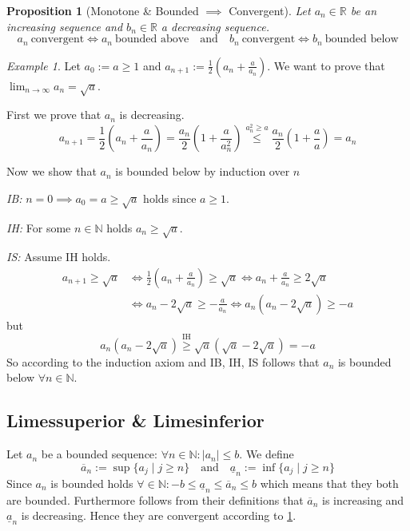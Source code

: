 \documentclass[english,titlepage]{uzhpub}
\theoremstyle{definition}
\theoremstyle{plain}
\newtheorem{proposition}[definition]{Proposition}
\theoremstyle{remark}
\theoremstyle{example}
\newtheorem*{example}{Example}
\begin{document}
   \begin{proposition}[Monotone \& Bounded \(\implies\) Convergent]\label{pro:convergent_monotone_sequence_bounded}
      Let \(a_n \in \mathbb{R}\) be an increasing sequence and \(b_n \in \mathbb{R}\) a decreasing sequence.
      \[a_n~\text{convergent} \iff a_n~\text{bounded above} \quad\text{and}\quad b_n~\text{convergent} \iff b_n~\text{bounded below}\]
   \end{proposition}
   \begin{example}
      Let \(a_0 := a \geq 1\) and \(a_{n+1} := \frac{1}{2} \left(a_n + \frac{a}{a_n}\right)\).
      We want to prove that \(\lim_{n \to \infty} a_n = \sqrt{a}\).

      First we prove that \(a_n\) is decreasing.
      \[a_{n+1} = \frac{1}{2} \left(a_n + \frac{a}{a_n}\right) = \frac{a_n}{2} \left(1 + \frac{a}{a_n^2}\right) \overset{a_n^2 \geq a}{\leq} \frac{a_n}{2} \left(1 + \frac{a}{a}\right) = a_n\]

      Now we show that \(a_n\) is bounded below by induction over \(n\)

      \textit{IB:} \(n = 0 \implies a_0 = a \geq \sqrt{a}\) holds since \(a \geq 1\).

      \textit{IH:} For some \(n \in \mathbb{N}\) holds \(a_n \geq \sqrt{a}\).

      \textit{IS:} Assume IH holds.
      \begin{equation*}
         \begin{split}
            a_{n+1} \geq \sqrt{a} & \iff \frac{1}{2} \left(a_n + \frac{a}{a_n}\right) \geq \sqrt{a} \iff a_n + \frac{a}{a_n} \geq 2 \sqrt{a}\\
                                  & \iff a_n - 2\sqrt{a} \geq - \frac{a}{a_n} \iff a_n(a_n - 2\sqrt{a}) \geq -a
         \end{split}
      \end{equation*}
      but
      \[a_n(a_n - 2 \sqrt{a}) \overset{\text{IH}}{\geq} \sqrt{a}(\sqrt{a} - 2 \sqrt{a}) = -a\]
      So according to the induction axiom and IB, IH, IS follows that \(a_n\) is bounded below \(\forall n \in \mathbb{N}\).
   \end{example}

   \subsection{Limessuperior \& Limesinferior}
   Let \(a_n\) be a bounded sequence: \(\forall n \in \mathbb{N}: |a_n| \leq b\).
   We define
   \[\overline{a}_n := \sup\{a_j \mid j \geq n\} \quad\text{and}\quad \underline{a}_n := \inf\{a_j \mid j \geq n\}\]
   Since \(a_n\) is bounded holds \(\forall \in \mathbb{N}: -b \leq \underline{a}_n \leq \overline{a}_n \leq b\) which means that they both are bounded.
   Furthermore follows from their definitions that \(\overline{a}_n\) is increasing and \(\underline{a}_n\) is decreasing.
   Hence they are convergent according to \cref{pro:convergent_monotone_sequence_bounded}.
\end{document}
